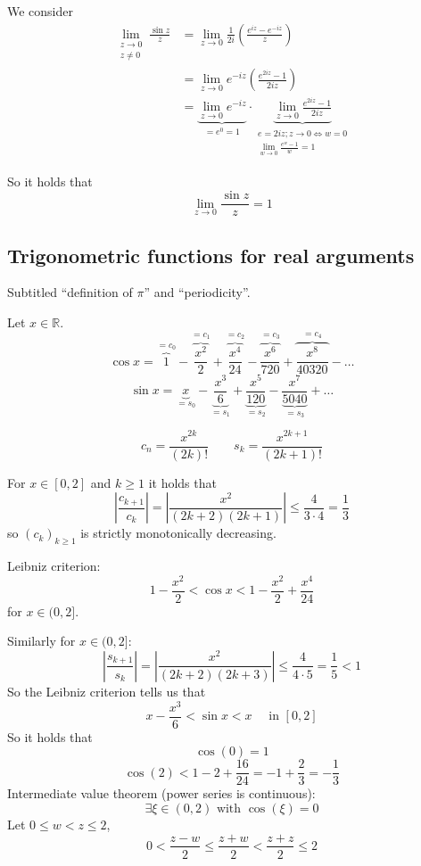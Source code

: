 \documentclass[a4paper,landscape,twocolumn]{article}
\theoremstyle{definition}
\newcommand\abs[1]{\left|#1\right|}
\begin{document}
We consider
\begin{align*}
  \lim_{\substack{z \to 0 \\ z \neq 0}} \frac{\sin{z}}{z}
    &= \lim_{z \to 0} \frac{1}{2i} \left(\frac{e^{iz} - e^{-iz}}{z}\right) \\
    &= \lim_{z \to 0} e^{-iz} \left(\frac{e^{2iz} - 1}{2iz}\right) \\
    &= \underbrace{\lim_{z \to 0} e^{-iz}}_{=e^0 = 1} \cdot \underbrace{\lim_{z \to 0} \frac{e^{2iz} - 1}{2iz}}_{\substack{e = 2iz; z \to 0 \Leftrightarrow w = 0 \\ \lim_{w \to 0} \frac{e^w - 1}{w} = 1}}
\end{align*}

So it holds that
\[ \lim_{z\to0} \frac{\sin{z}}{z} = 1 \]

\subsection{Trigonometric functions for real arguments}
%
Subtitled \enquote{definition of $\pi$} and \enquote{periodicity}.

Let $x \in \mathbb R$.
\[ \cos{x} = \overbrace{1}^{=c_0} - \overbrace{\frac{x^2}{2}}^{=c_1} + \overbrace{\frac{x^4}{24}}^{=c_2} - \overbrace{\frac{x^6}{720}}^{=c_3} + \overbrace{\frac{x^8}{40320}}^{=c_4} - \ldots \]
\[ \sin{x} = \underbrace{x}_{=s_0} - \underbrace{\frac{x^3}{6}}_{=s_1} + \underbrace{\frac{x^5}{120}}_{=s_2} - \underbrace{\frac{x^7}{5040}}_{=s_3} + \ldots \]

\[ c_n = \frac{x^{2k}}{(2k)!} \qquad s_k = \frac{x^{2k+1}}{(2k+1)!} \]

For $x \in [0,2]$ and $k \geq 1$ it holds that
\[ \abs{\frac{c_{k+1}}{c_k}} = \abs{\frac{x^2}{(2k + 2)(2k + 1)}} \leq \frac{4}{3 \cdot 4} = \frac13 \]
so $(c_k)_{k\geq1}$ is strictly monotonically decreasing.

Leibniz criterion:
\[ 1 - \frac{x^2}{2} < \cos{x} < 1 - \frac{x^2}{2} + \frac{x^4}{24} \]
for $x \in (0,2]$.

Similarly for $x \in (0,2]$:
\[ \abs{\frac{s_{k+1}}{s_k}} = \abs{\frac{x^2}{(2k + 2)(2k + 3)}} \leq \frac{4}{4 \cdot 5} = \frac15 < 1 \]
So the Leibniz criterion tells us that
\[ x - \frac{x^3}{6} < \sin{x} < x \quad \text{ in } [0, 2] \]
So it holds that
\[ \cos(0) = 1 \]
\[ \cos(2) < 1 - 2 + \frac{16}{24} = -1 + \frac23 = -\frac13 \]
Intermediate value theorem (power series is continuous):
\[ \exists \xi \in (0,2) \text{ with } \cos(\xi) = 0 \]
Let $0 \leq w < z \leq 2$,
\[ 0 < \frac{z-w}{2} \leq \frac{z+w}{2} < \frac{z + z}{2} \leq 2 \]
\end{document}
